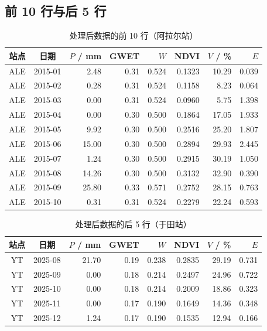 \documentclass[11pt,a4paper]{ctexart}
\begin{document}
\subsection{前 10 行与后 5 行}

\begin{table}[H]\centering\footnotesize
\begin{tabular}{|c|c|r|r|r|r|r|r|}
\toprule
站点 & 日期 & $P$ / mm & GWET & $W$ & NDVI & $V$ / \% & $E$ \\
\midrule
ALE & 2015-01 & 2.48 & 0.31 & 0.524 & 0.1323 & 10.29 & 0.039 \\
ALE & 2015-02 & 0.28 & 0.31 & 0.524 & 0.1158 & 8.23 & 0.064 \\
ALE & 2015-03 & 0.00 & 0.31 & 0.524 & 0.0960 & 5.75 & 1.398 \\
ALE & 2015-04 & 0.00 & 0.30 & 0.500 & 0.1864 & 17.05 & 1.933 \\
ALE & 2015-05 & 9.92 & 0.30 & 0.500 & 0.2516 & 25.20 & 1.807 \\
ALE & 2015-06 & 15.00 & 0.30 & 0.500 & 0.2894 & 29.93 & 2.445 \\
ALE & 2015-07 & 1.24 & 0.30 & 0.500 & 0.2915 & 30.19 & 1.050 \\
ALE & 2015-08 & 14.26 & 0.30 & 0.500 & 0.3132 & 32.90 & 0.390 \\
ALE & 2015-09 & 25.80 & 0.33 & 0.571 & 0.2752 & 28.15 & 0.763 \\
ALE & 2015-10 & 0.31 & 0.31 & 0.524 & 0.2279 & 22.24 & 0.593 \\
\bottomrule
\end{tabular}
\caption{处理后数据的前 10 行（阿拉尔站）}
\end{table}

\begin{table}[H]\centering\footnotesize
\begin{tabular}{|c|c|r|r|r|r|r|r|}
\toprule
站点 & 日期 & $P$ / mm & GWET & $W$ & NDVI & $V$ / \% & $E$ \\
\midrule
YT & 2025-08 & 21.70 & 0.19 & 0.238 & 0.2835 & 29.19 & 0.731 \\
YT & 2025-09 & 0.00 & 0.18 & 0.214 & 0.2497 & 24.96 & 0.722 \\
YT & 2025-10 & 0.00 & 0.18 & 0.214 & 0.2009 & 18.86 & 0.323 \\
YT & 2025-11 & 0.00 & 0.17 & 0.190 & 0.1649 & 14.36 & 0.348 \\
YT & 2025-12 & 1.24 & 0.17 & 0.190 & 0.1535 & 12.94 & 0.166 \\
\bottomrule
\end{tabular}
\caption{处理后数据的后 5 行（于田站）}
\end{table}
\end{document}
